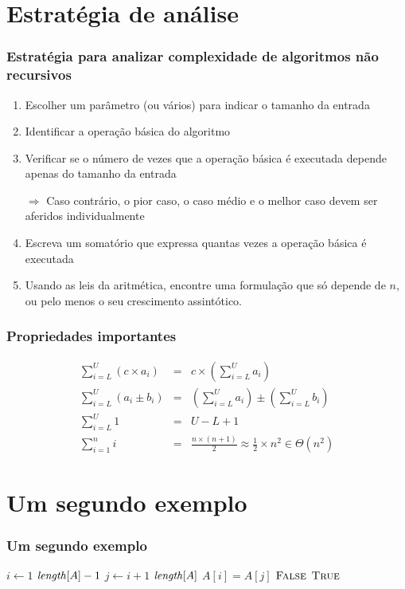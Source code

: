 \documentclass[handout]{beamer}
\begin{document}
\section{Estratégia de análise}

\begin{frame}
\frametitle{Estratégia para analizar complexidade de algoritmos não recursivos}

\begin{enumerate}
\item Escolher um parâmetro (ou vários) para indicar o tamanho da entrada
\item Identificar a operação básica do algoritmo
\item Verificar se o número de vezes que a operação básica é executada depende apenas do tamanho da entrada

\alert{$\Rightarrow$} Caso contrário, o pior caso, o caso médio e o melhor caso devem ser aferidos individualmente
\item Escreva um somatório que expressa quantas vezes a operação básica é executada
\item Usando as leis da aritmética, encontre uma formulação que só depende de $n$, ou pelo menos o seu crescimento assintótico.
\end{enumerate}

\end{frame}

\begin{frame}
\frametitle{Propriedades importantes}

\begin{eqnarray*}
\sum_{i=L}^U \left(c \times a_i\right) & = & c \times \left(\sum_{i = L}^U a_i \right) \\
\sum_{i=L}^U \left(a_i \pm b_i\right) & = & \left(\sum_{i = L}^U a_i \right) \pm \left(\sum_{i = L}^U b_i \right) \\
\sum_{i=L}^U 1 & = & U - L + 1 \\
\sum_{i=1}^n i & = & \frac{n\times (n+1)}{2} \approx \frac{1}{2}\times n^2 \in \Theta(n^2)
\end{eqnarray*}

\end{frame}

\section{Um segundo exemplo}
\begin{frame}
\frametitle{Um segundo exemplo}
\begin{example}
\begin{codebox}
\li \For $i \gets 1$ \To $\id{length}[A]-1$
\li \Do
\li   \For $j \gets i+1$ \To $\id{length}[A]$
\li   \Do
\li     \If $A[i] = A[j]$
\li     \Then
          \Return $\textnormal{\scshape False}$
        \End    
      \End    
    \End    
\li \Return $\textnormal{\scshape True}$
\end{codebox}
\end{example}
\end{frame}
\end{document}
